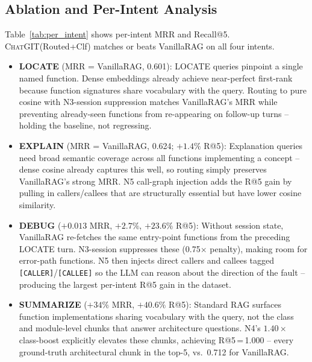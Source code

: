 \documentclass[conference]{IEEEtran}
\newcommand{\chatgit}{\textsc{ChatGIT}\xspace}
\begin{document}
\subsection{Ablation and Per-Intent Analysis}

Table~\ref{tab:per_intent} shows per-intent MRR and Recall@5.
\chatgit (Routed+Clf) matches or beats VanillaRAG on all four intents.

\begin{itemize}
  \item \textbf{LOCATE} (MRR = VanillaRAG, 0.601): LOCATE queries pinpoint a
        single named function. Dense embeddings already achieve near-perfect
        first-rank because function signatures share vocabulary with the
        query. Routing to pure cosine with N3-session suppression matches
        VanillaRAG's MRR while preventing already-seen functions from
        re-appearing on follow-up turns -- holding the baseline, not regressing.

  \item \textbf{EXPLAIN} (MRR = VanillaRAG, 0.624; $+1.4\%$ R@5): Explanation queries
        need broad semantic coverage across all functions implementing a
        concept -- dense cosine already captures this well, so routing simply
        preserves VanillaRAG's strong MRR. N5 call-graph injection adds the
        R@5 gain by pulling in callers/callees that are structurally essential
        but have lower cosine similarity.

  \item \textbf{DEBUG} ($+0.013$ MRR, $+2.7\%$, $+23.6\%$ R@5): Without session
        state, VanillaRAG re-fetches the same entry-point functions from
        the preceding LOCATE turn. N3-session suppresses these (0.75$\times$
        penalty), making room for error-path functions. N5 then injects
        direct callers and callees tagged \texttt{[CALLER]}/\texttt{[CALLEE]}
        so the LLM can reason about the direction of the fault -- producing
        the largest per-intent R@5 gain in the dataset.

  \item \textbf{SUMMARIZE} ($+34\%$ MRR, $+40.6\%$ R@5): Standard RAG
        surfaces function implementations sharing vocabulary with the query,
        not the class and module-level chunks that answer architecture
        questions. N4's $1.40\times$ class-boost explicitly elevates these
        chunks, achieving R@5\,=\,1.000 -- every ground-truth architectural
        chunk in the top-5, vs.\ 0.712 for VanillaRAG.
\end{itemize}
\end{document}
